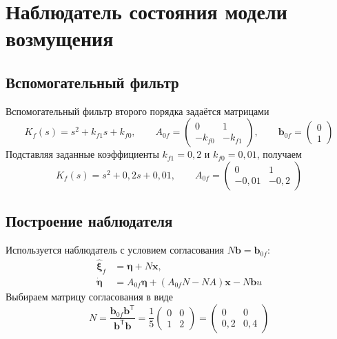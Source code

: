 \section{Наблюдатель состояния модели возмущения}

\subsection{Вспомогательный фильтр}
Вспомогательный фильтр второго порядка задаётся матрицами
\begin{equation}
  K_f(s)=s^2+k_{f1}s+k_{f0},
  \qquad
  A_{0f}=\begin{pmatrix}0&1\\-k_{f0}&-k_{f1}\end{pmatrix},
  \qquad \bm b_{0f}=\begin{pmatrix}0\\1\end{pmatrix}
  \label{eq:disturbance-filter}
\end{equation}
Подставляя заданные коэффициенты $k_{f1}=0{,}2$ и $k_{f0}=0{,}01$,
получаем
\begin{equation}
  K_f(s)=s^2+0{,}2s+0{,}01,
  \qquad
  A_{0f}=\begin{pmatrix}0&1\\-0{,}01&-0{,}2\end{pmatrix}
  \label{eq:disturbance-filter-numeric}
\end{equation}

\subsection{Построение наблюдателя}

Используется наблюдатель с условием согласования
$N\bm b=\bm b_{0f}$:
\begin{equation}
  \begin{aligned}
    \hat{\bm\xi}_f&=\bm\eta+N\bm x,\\
    \dot{\bm\eta}
      &=A_{0f}\bm\eta+(A_{0f}N-NA)\bm x-N\bm b u
  \end{aligned}
  \label{eq:observer}
\end{equation}
Выбираем матрицу согласования в виде
\begin{equation}
  N=\frac{\bm b_{0f}\bm b^{\mathsf T}}{\bm b^{\mathsf T}\bm b}
  =\frac{1}{5}\begin{pmatrix}0&0\\1&2\end{pmatrix}
  =\begin{pmatrix}0&0\\0{,}2&0{,}4\end{pmatrix}
  \label{eq:observer-matching-matrix}
\end{equation}


